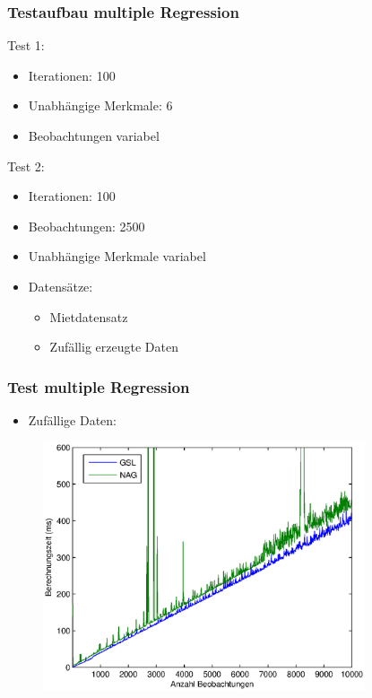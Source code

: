 \documentclass{beamer}
\begin{document}
\begin{frame}
  \frametitle{Testaufbau multiple Regression}
  
  \begin{block}{Test 1:}
    \begin{itemize}
    \item Iterationen: 100
    \item Unabhängige Merkmale: 6
    \item Beobachtungen variabel
    \end{itemize}
  \end{block}

  \begin{block}{Test 2:}
    \begin{itemize}
    \item Iterationen: 100
    \item Beobachtungen: 2500
    \item Unabhängige Merkmale variabel
    \end{itemize}
  \end{block}
  
  \begin{itemize}
  \item Datensätze:
    \begin{itemize}
    \item Mietdatensatz
    \item Zufällig erzeugte Daten
    \end{itemize}
  \end{itemize}
  
\end{frame}

\begin{frame}
  \frametitle{Test multiple Regression}

  \begin{itemize}
  \item Zufällige Daten:
  \end{itemize}

  \begin{figure}[t]
    \centering
    \includegraphics[width=9.5cm]{figures/multi_reg_comp_6_var.eps}
  \end{figure}

\end{frame}
\end{document}

